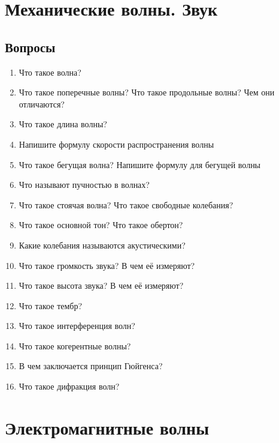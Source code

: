 \documentclass[12pt,a4paper]{report}
\begin{document}
\chapter{Механические волны. Звук}
\section{Вопросы}
\begin{enumerate}
\item Что такое волна?
\item Что такое поперечные волны? Что такое продольные волны? Чем они отличаются?
\item Что такое длина волны?
\item Напишите формулу скорости распространения волны
\item Что такое бегущая волна? Напишите формулу для бегущей волны 
\item Что называют пучностью в волнах?
\item Что такое стоячая волна? Что такое свободные колебания?
\item Что такое основной тон? Что такое обертон?
\item Какие колебания называются акустическими?
\item Что такое громкость звука? В чем её измеряют?
\item Что такое высота звука? В чем её измеряют?
\item Что такое тембр?
\item Что такое интерференция волн?
\item Что такое когерентные волны?
\item В чем заключается принцип Гюйгенса?
\item Что такое дифракция волн?
\end{enumerate}

\chapter{Электромагнитные волны}
\end{document}
